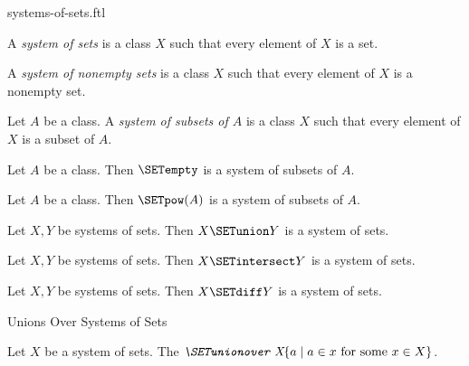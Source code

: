 \documentclass{naproche-library}
\begin{document}
\begin{smodule}[title=Systems of Sets]{systems-of-sets.ftl}


\begin{definition}[forthel,id=FOUNDATIONS_10_5805323570905088]
  A \emph{system of sets} is a class $X$ such that every element of $X$ is a set.
\end{definition}

\begin{definition}[forthel,id=FOUNDATIONS_10_1631952387964928]
  A \emph{system of nonempty sets} is a class $X$ such that every element of $X$ is a nonempty set.
\end{definition}

\begin{definition}[forthel,id=FOUNDATIONS_10_943381479948288]
  Let $A$ be a class.
  A \emph{system of subsets of $A$} is a class $X$ such that every element of $X$ is a subset of $A$.
\end{definition}

\begin{proposition}[forthel,id=FOUNDATIONS_10_8268633648136192]
  Let $A$ be a class.
  Then $\SETempty$ is a system of subsets of $A$.
\end{proposition}

\begin{proposition}[forthel,id=FOUNDATIONS_10_7546016869908480]
  Let $A$ be a class.
  Then $\SETpow(A)$ is a system of subsets of $A$.
\end{proposition}

\begin{proposition}
  Let $X, Y$ be systems of sets.
  Then $X \SETunion Y$ is a system of sets.
\end{proposition}

\begin{proposition}
  Let $X, Y$ be systems of sets.
  Then $X \SETintersect Y$ is a system of sets.
\end{proposition}

\begin{proposition}
  Let $X, Y$ be systems of sets.
  Then $X \SETdiff Y$ is a system of sets.
\end{proposition}

\begin{sfragment}{Unions Over Systems of Sets}
  \begin{definition}[forthel,id=FOUNDATIONS_10_541772562300928]
    Let $X$ be a system of sets.
    The $\emph{\SETunionover X} \{ a \mid a \in x\text{ for some }x \in X \}$.


\end{definition}
\end{sfragment}
\end{smodule}
\end{document}
